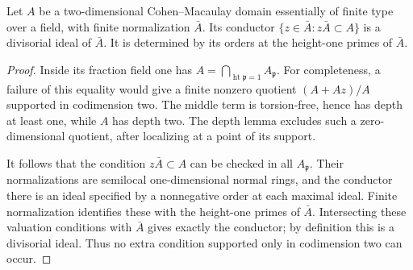 \begin{lemma}
\label{lem:conductor-depth-v170}
Let $A$ be a two-dimensional Cohen--Macaulay domain essentially of finite
type over a field, with finite normalization $\bar A$. Its conductor
$\{z\in\bar A:z\bar A\subset A\}$ is a divisorial ideal of $\bar A$.
It is determined by its orders at the height-one primes of $\bar A$.
\end{lemma}
\begin{proof}
Inside its fraction field one has
$A=\bigcap_{\operatorname{ht}\mathfrak p=1}A_{\mathfrak p}$.
For completeness, a failure of this equality would give a finite
nonzero quotient $(A+Az)/A$ supported in codimension two. The middle
term is torsion-free, hence has depth at least one, while $A$ has
depth two. The depth lemma excludes such a zero-dimensional quotient,
after localizing at a point of its support.

It follows that the condition $z\bar A\subset A$ can be checked
in all $A_{\mathfrak p}$. Their normalizations are semilocal
one-dimensional normal rings, and the conductor there is an ideal
specified by a nonnegative order at each maximal ideal. Finite
normalization identifies these with the height-one primes of
$\bar A$. Intersecting these valuation conditions with $\bar A$
gives exactly the conductor; by definition this is a divisorial
ideal. Thus no extra condition supported only in codimension two
can occur.
\end{proof}

